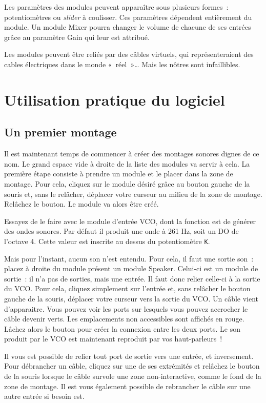 \documentclass[a4paper,oneside,frenchb,10pt]{article}
\begin{document}
Les paramètres des modules peuvent apparaître sous plusieurs formes~:
potentiomètres ou \emph{slider} à coulisser. Ces paramètres dépendent
entièrement du module. Un module Mixer pourra changer le volume
de chacune de ses entrées grâce au paramètre Gain qui leur est attribué.

Les modules peuvent être reliés par des câbles virtuels, qui
représenteraient des cables électriques dans le monde «~réel~»\ldots{}
Mais les nôtres sont infaillibles.

\section{Utilisation pratique du logiciel}

\subsection{Un premier montage}

Il est maintenant temps de commencer à créer des montages sonores dignes
de ce nom. Le grand espace vide à droite de la liste des modules va
servir à cela. La première étape consiste à prendre un module et le
placer dans la zone de montage. Pour cela, cliquez sur le module désiré
grâce au bouton gauche de la souris et, sans le relâcher, déplacer votre
curseur au milieu de la zone de montage. Relâchez le bouton. Le module
va alors être créé.

Essayez de le faire avec le module d'entrée VCO, dont la fonction est de
générer des ondes sonores. Par défaut il produit une onde à 261 Hz, soit
un DO de l'octave 4. Cette valeur est inscrite au dessus du
potentiomètre \verb!K!.

Mais pour l'instant, aucun son n'est entendu. Pour cela, il faut une
sortie son~: placez à droite du module présent un module Speaker.
Celui-ci est un module de sortie~: il n'a pas de sorties, mais une
entrée. Il faut donc relier celle-ci à la sortie du VCO. Pour cela,
cliquez simplement sur l'entrée et, sans relâcher le bouton gauche de la
souris, déplacer votre curseur vers la sortie du VCO. Un câble vient
d'apparaitre. Vous pouvez voir les ports sur lesquels vous pouvez
accrocher le câble devenir verts. Les emplacements non accessibles sont
affichés en rouge. Lâchez alors le bouton pour créer la connexion entre
les deux ports. Le son produit par le VCO est maintenant reproduit par
vos haut-parleurs~!

Il vous est possible de relier tout port de sortie vers une entrée, et
inversement. Pour débrancher un câble, cliquez sur une de ses extrémités
et relâchez le bouton de la souris lorsque le câble survole une zone
non-interactive, comme le fond de la zone de montage. Il est vous
également possible de rebrancher le câble sur une autre entrée si besoin
est.
\end{document}
